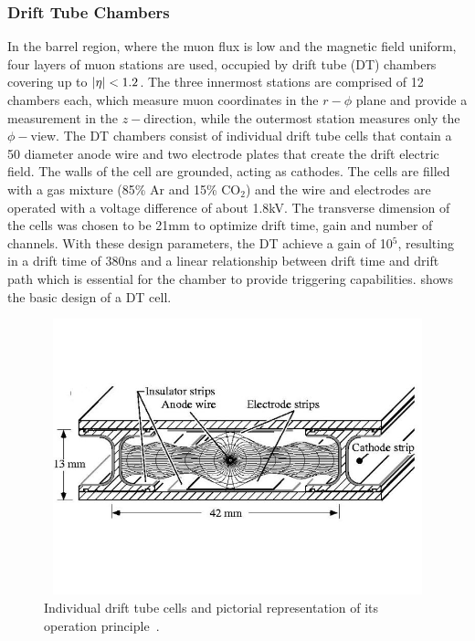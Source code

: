 \subsubsection{Drift Tube Chambers}
In the barrel region, where the muon flux is low and the magnetic field uniform, four layers of muon stations are used, occupied by drift tube (DT) 
chambers covering up to $\lvert \eta \rvert<1.2$. The three innermost stations are comprised of 12 chambers each, which measure muon coordinates in the $r-\phi$ plane and provide a measurement in the $z-$direction, while the outermost station measures only the 
$\phi-$view. The DT chambers 
consist of individual drift tube cells that contain a 50\unit{} diameter anode wire and two electrode plates that
 create the drift electric field. The walls of the cell are grounded, acting as cathodes. 
The cells are filled with a gas mixture (85\% Ar and 15\% CO$_{2}$) and the wire and electrodes are operated with a voltage difference of 
about 1.8\unit{kV}. The transverse dimension of the cells was chosen to be 21\unit{mm} to optimize drift time, gain and number of channels. 
With these design parameters, the DT achieve a gain of 10$^{5}$, resulting in a drift time of 380\unit{ns} and a linear relationship between 
drift time and drift path which is essential for the chamber to provide triggering capabilities. \Fig{\ref{fig:cmsDT}} shows the basic design 
of a DT cell. 

\begin{figure}[h!]
 \centering
 \includegraphics[width=13cm,height=8cm]{ch2/figures/DT.jpg}
 \caption{Individual drift tube cells and pictorial representation of its operation principle~\cite{cmsTDR}.}
 \label{fig:cmsDT}
\end{figure}

